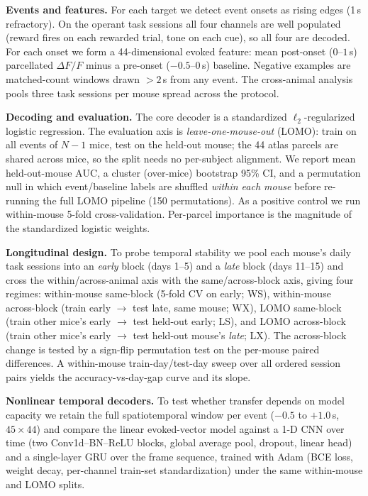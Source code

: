 \documentclass{article}
\newcommand{\auc}{\mathrm{AUC}}
\begin{document}
\textbf{Events and features.} For each target we detect event onsets as rising edges (1\,s
refractory). On the operant task sessions all four channels are well populated (reward fires on
each rewarded trial, tone on each cue), so all four are decoded. For each onset we form a
44-dimensional evoked feature: mean post-onset ($0$--$1$\,s) parcellated $\Delta F/F$ minus a
pre-onset ($-0.5$--$0$\,s) baseline. Negative examples are matched-count windows drawn $>2$\,s
from any event. The cross-animal analysis pools three task sessions per mouse spread across the
protocol.

\textbf{Decoding and evaluation.} The core decoder is a standardized $\ell_2$-regularized logistic
regression. The evaluation axis is \emph{leave-one-mouse-out} (LOMO): train on all events of
$N{-}1$ mice, test on the held-out mouse; the 44 atlas parcels are shared across mice, so the
split needs no per-subject alignment. We report mean held-out-mouse $\auc$, a cluster
(over-mice) bootstrap 95\% CI, and a permutation null in which event/baseline labels are shuffled
\emph{within each mouse} before re-running the full LOMO pipeline (150 permutations). As a
positive control we run within-mouse 5-fold cross-validation. Per-parcel importance is the
magnitude of the standardized logistic weights.

\textbf{Longitudinal design.} To probe temporal stability we pool each mouse's daily task sessions
into an \emph{early} block (days 1--5) and a \emph{late} block (days 11--15) and cross the
within/across-animal axis with the same/across-block axis, giving four regimes: within-mouse
same-block (5-fold CV on early; WS), within-mouse across-block (train early $\to$ test late, same
mouse; WX), LOMO same-block (train other mice's early $\to$ test held-out early; LS), and LOMO
across-block (train other mice's early $\to$ test held-out mouse's \emph{late}; LX). The
across-block change is tested by a sign-flip permutation test on the per-mouse paired differences.
A within-mouse train-day/test-day sweep over all ordered session pairs yields the
accuracy-vs-day-gap curve and its slope.

\textbf{Nonlinear temporal decoders.} To test whether transfer depends on model capacity we retain
the full spatiotemporal window per event ($-0.5$ to $+1.0$\,s, $45{\times}44$) and compare the
linear evoked-vector model against a 1-D CNN over time (two Conv1d--BN--ReLU blocks, global
average pool, dropout, linear head) and a single-layer GRU over the frame sequence, trained with
Adam (BCE loss, weight decay, per-channel train-set standardization) under the same within-mouse
and LOMO splits.
\end{document}

